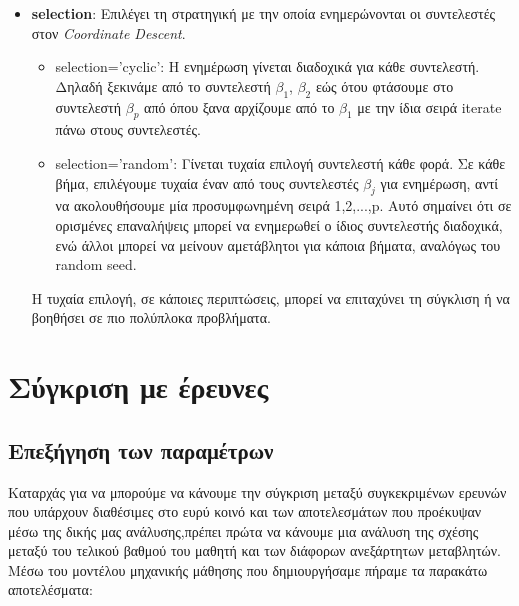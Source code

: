 \documentclass[12pt]{article}
\begin{document}
\begin{itemize}
    \item \textbf{\textlatin{selection}}:
      Επιλέγει τη στρατηγική με την οποία ενημερώνονται οι συντελεστές στον \textlatin{\emph{Coordinate Descent}}. 
      \begin{itemize}
        \item \textlatin{selection='cyclic'}: Η ενημέρωση γίνεται διαδοχικά για κάθε συντελεστή. Δηλαδή ξεκινάμε από το συντελεστή $\beta_1$, $\beta_2$ εώς ότου φτάσουμε στο συντελεστή $\beta_p$ από όπου ξανα αρχίζουμε από το $\beta_1$ με την ίδια σειρά iterate πάνω στους συντελεστές. 
        \item \textlatin{selection='random'}: Γίνεται τυχαία επιλογή συντελεστή κάθε φορά. Σε κάθε βήμα, επιλέγουμε τυχαία έναν από τους συντελεστές $\beta_j$ για ενημέρωση, αντί να ακολουθήσουμε μία προσυμφωνημένη σειρά 1,2,...,p. Αυτό σημαίνει ότι σε ορισμένες επαναλήψεις μπορεί να ενημερωθεί ο ίδιος συντελεστής διαδοχικά, ενώ άλλοι μπορεί να μείνουν αμετάβλητοι για κάποια βήματα, αναλόγως του \textlatin{random seed}.
      \end{itemize}
      Η τυχαία επιλογή, σε κάποιες περιπτώσεις, μπορεί να επιταχύνει τη σύγκλιση ή να βοηθήσει σε πιο πολύπλοκα προβλήματα.
    
    \end{itemize}

\newpage
\section{Σύγκριση με έρευνες}
\subsection{Επεξήγηση των παραμέτρων}
 Καταρχάς για να μπορούμε να κάνουμε την σύγκριση μεταξύ συγκεκριμένων ερευνών που υπάρχουν
 διαθέσιμες στο ευρύ κοινό και των αποτελεσμάτων που  προέκυψαν μέσω της δικής μας ανάλυσης,πρέπει
 πρώτα να κάνουμε μια ανάλυση της σχέσης μεταξύ του τελικού βαθμού του μαθητή και των διάφορων
 ανεξάρτητων μεταβλητών. \\
 
\noindent  Μέσω του μοντέλου μηχανικής μάθησης που δημιουργήσαμε πήραμε τα παρακάτω αποτελέσματα: \\
\end{document}
